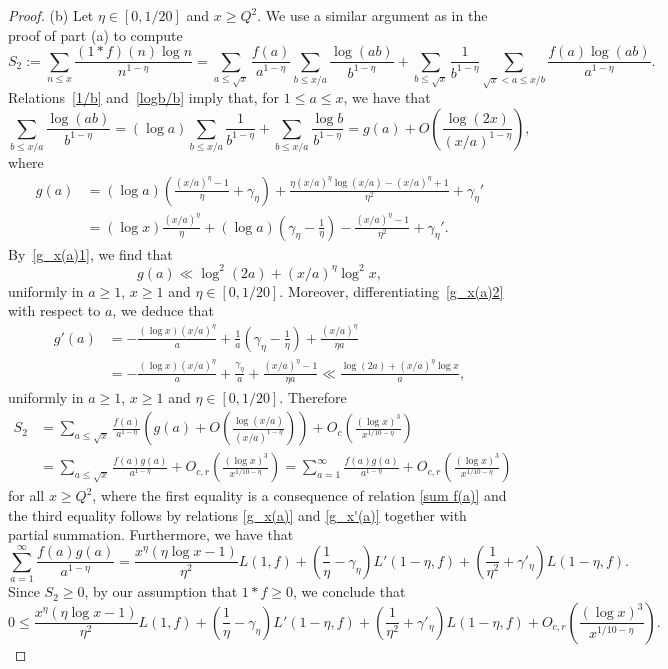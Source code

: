 \documentclass[12pt]{amsart}
\theoremstyle{remark}
\newcommand{\bsp}{\begin{split}}
\newcommand{\be}{\begin{equation}}
\newcommand{\ee}{\end{equation}}
\newcommand{\bes}{\begin{equation*}}
\newcommand{\ees}{\end{equation*}}
\numberwithin{equation}{section}
\begin{document}
\begin{proof}
(b) Let $\eta\in[0,1/20]$ and $x\ge Q^2$. We use a similar argument as in the proof of part (a) to compute
\[
S_2:= \sum_{n\le x}\frac{(1*f)(n)\log n}{n^{1-\eta}}=\sum_{a\le\sqrt{x}}\frac{f(a)}{a^{1-\eta}}\sum_{b\le x/a}\frac{\log(ab)}{b^{1-\eta}}+\sum_{b\le\sqrt{x}}\frac1{b^{1-\eta}}\sum_{\sqrt{x}<a\le x/b}\frac{f(a)\log(ab)}{a^{1-\eta}}.
\]
Relations~\eqref{1/b} and~\eqref{logb/b} imply that, for $1\le a\le x$, we have that
\[
\sum_{b\le x/a}\frac{\log(ab)}{b^{1-\eta}} = (\log a)\sum_{b\le x/a}\frac{1}{b^{1-\eta}} + \sum_{b\le x/a}\frac{\log b}{b^{1-\eta}}= g(a) + O\left(\frac{\log(2x)}{(x/a)^{1-\eta}}\right),
\]
where
\begin{align}
g(a)
&= (\log a)\left(\frac{(x/a)^\eta-1}{\eta}+\gamma_\eta\right)+\frac{\eta(x/a)^\eta\log(x/a) - (x/a)^\eta+1}{\eta^2}+\gamma_\eta' \label{g_x(a)1}\\
&= (\log x)\frac{(x/a)^\eta}{\eta}+(\log a)\left(\gamma_\eta-\frac1\eta\right) - \frac{(x/a)^\eta-1}{\eta^2}+\gamma_\eta' \label{g_x(a)2}.
\end{align}
By~\eqref{g_x(a)1}, we find that
\be\label{g_x(a)}
g(a)\ll \log^2(2a) + (x/a)^\eta\log^2x,
\ee
uniformly in $a\ge1$, $x\ge1$ and $\eta\in[0,1/20]$. Moreover, differentiating~\eqref{g_x(a)2} with respect to $a$, we deduce that
\be\label{g_x'(a)}\begin{split}
g'(a)
&= -\frac{(\log x)(x/a)^\eta}{a}+\frac1a\left(\gamma_\eta-\frac1\eta\right)+\frac{(x/a)^\eta}{\eta a} \\
&= -\frac{(\log x)(x/a)^\eta}{a}+\frac{\gamma_\eta}a+\frac{(x/a)^\eta-1}{\eta a} \ll\frac{\log(2a)+(x/a)^\eta\log x}{a},
\end{split}\ee
uniformly in $a\ge1$, $x\ge1$ and $\eta\in[0,1/20]$. Therefore
\bes\bsp
S_2&=\sum_{a\le\sqrt{x}}\frac{f(a)}{a^{1-\eta}}\left(g(a)+O\left(\frac{\log(x/a)}{(x/a)^{1-\eta}}\right)\right)
+O_c\left(\frac{(\log x)^3}{x^{1/10-\eta}}\right)\\
&=\sum_{a\le\sqrt{x}}\frac{f(a)g(a)}{a^{1-\eta}}+O_{c,r}\left(\frac{(\log x)^3}{x^{1/10-\eta}}\right)
= \sum_{a=1}^\infty\frac{f(a)g(a)}{a^{1-\eta}}+O_{c,r}\left(\frac{(\log x)^3}{x^{1/10-\eta}}\right)
\end{split}\ees
for all $x\ge Q^2$, where the first equality is a consequence of relation \eqref{sum f(a)} and the third equality follows by relations \eqref{g_x(a)} and \eqref{g_x'(a)} together with partial summation. Furthermore, we have that
\[
\sum_{a=1}^\infty\frac{f(a)g(a)}{a^{1-\eta}} = \frac{x^\eta(\eta\log x-1)}{\eta^2}L(1,f)+\left(\frac1\eta-\gamma_\eta\right)L'(1-\eta,f)+\left(\frac1{\eta^2}+\gamma'_\eta\right)L(1-\eta,f).
\]
Since $S_2\ge0$, by our assumption that $1*f\ge0$, we conclude that
\be\label{L'(1,f)}
0\le \frac{x^\eta(\eta\log x-1)}{\eta^2}L(1,f)+\left(\frac1\eta-\gamma_\eta\right)L'(1-\eta,f)+\left(\frac1{\eta^2}+\gamma'_\eta\right)L(1-\eta,f) +O_{c,r}\left(\frac{(\log x)^3}{x^{1/10-\eta}}\right).
\ee


\end{proof}
\end{document}
